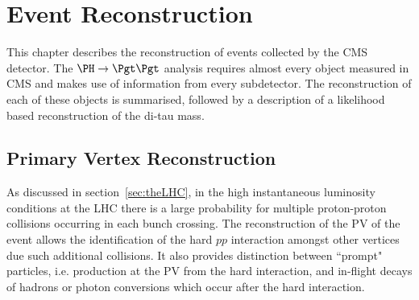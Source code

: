 \chapter{Event Reconstruction}
\label{chap:reco}

This chapter describes the reconstruction of events collected by the CMS
detector. The $\PH \to \Pgt\Pgt$ analysis requires almost every object measured in
CMS and makes use of information from every subdetector. The reconstruction of
each of these objects is summarised, followed by a description of a likelihood based
reconstruction of the di-tau mass. 



\section{Primary Vertex Reconstruction}
\label{sec:vertex}

As discussed in section~\ref{sec:theLHC}, in the high instantaneous luminosity
conditions at the LHC there is a large probability for multiple proton-proton
collisions occurring in each bunch crossing. 
The reconstruction of the \ac{PV} of the event allows the identification of the hard
$pp$ interaction amongst other vertices due such additional collisions. 
It also provides distinction between ``prompt" particles, i.e. production at the \ac{PV} from the hard
interaction, and in-flight decays of hadrons or photon conversions which occur
after the hard interaction.  

